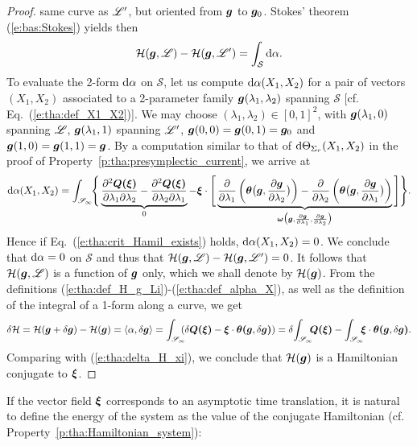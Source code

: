 \begin{proof}
same curve as $\mathscr{L}'$, but oriented from $\bm{g}$ to $\bm{g}_0$.
Stokes' theorem (\ref{e:bas:Stokes}) yields then
\[
    \mathcal{H}(\bm{g},\mathscr{L}) - \mathcal{H}(\bm{g},\mathscr{L}') = \int_{\mathcal{S}} \mathrm{d} \alpha .
\]
To evaluate the 2-form $\mathrm{d} \alpha$ on $\mathcal{S}$, let us compute
$\mathrm{d} \alpha(X_1,X_2)$ for a pair of vectors $(X_1,X_2)$ associated to a
2-parameter family $\bm{g}(\lambda_1,\lambda_2)$ spanning $\mathcal{S}$
[cf. Eq.~(\ref{e:tha:def_X1_X2})]. We may choose $(\lambda_1,\lambda_2)\in[0,1]^2$,
with $\bm{g}(\lambda_1,0)$ spanning $\mathscr{L}$, $\bm{g}(\lambda_1,1)$ spanning $\mathscr{L}'$,
$\bm{g}(0,0) = \bm{g}(0,1) = \bm{g}_0$ and $\bm{g}(1,0) = \bm{g}(1,1) = \bm{g}$.
By a computation similar to that of $\mathrm{d} \Theta_{\Sigma_r} (X_1,X_2)$ in the proof
of Property~\ref{p:tha:presymplectic_current}, we arrive at
\[
    \mathrm{d} \alpha(X_1,X_2) =
    \int_{\mathscr{S}_\infty}\!\!  \Bigg\{
    \underbrace{\frac{\partial^2 \bm{Q}\textbf{(}\bm{\xi}\textbf{)}}{\partial\lambda_1\partial\lambda_2}
    - \frac{\partial^2 \bm{Q}\textbf{(}\bm{\xi}\textbf{)}}{\partial\lambda_2\partial\lambda_1}}_{0}
    - \bm{\xi}\cdot \Bigg[
    \underbrace{
    \frac{\partial }{\partial \lambda_1}
        \left( \bm{\theta} \bm{\big(}\bm{g}, \frac{\partial \bm{g}}{\partial \lambda_2} \bm{\big)} \right)
        - \frac{\partial }{\partial \lambda_2}\left( \bm{\theta}\bm{\big(}\bm{g}, \frac{\partial \bm{g}}{\partial \lambda_1} \bm{\big)} \right)
    }_{\bm{\omega}\bm{\big(}\bm{g},  \frac{\partial \bm{g}}{\partial \lambda_1}, \frac{\partial \bm{g}}{\partial \lambda_2} \bm{\big)}}
        \Bigg] \Bigg\} .
\]
Hence if Eq.~(\ref{e:tha:crit_Hamil_exists}) holds, $\mathrm{d}\alpha(X_1,X_2) = 0$.
We conclude that $\mathrm{d} \alpha = 0$ on $\mathcal{S}$ and thus that
$\mathcal{H}(\bm{g},\mathscr{L}) - \mathcal{H}(\bm{g},\mathscr{L}') = 0$. It follows that
$\mathcal{H}(\bm{g},\mathscr{L})$ is a function of $\bm{g}$ only, which we shall denote
by $\mathcal{H}(\bm{g})$.
From the definitions (\ref{e:tha:def_H_g_Li})-(\ref{e:tha:def_alpha_X}),
as well as the definition of the integral of a 1-form along a curve,
we get
\[
   \delta\mathcal{H} = \mathcal{H}(\w{g}+\delta\w{g}) - \mathcal{H}(\w{g})
   =  \langle \alpha, \delta\w{g} \rangle
     = \int_{\Sp_\infty}\!\!\!\! \left( \delta \w{Q}\lld\w{\xi}\rld
     -  \w{\xi}\cdot\w{\theta}\lld\w{g},\delta\w{g}\rld \right)
    = \delta\! \int_{\Sp_\infty}\!\!\! \w{Q}\lld\w{\xi}\rld
     -  \int_{\Sp_\infty} \!\!\! \w{\xi}\cdot\w{\theta}\lld\w{g},\delta\w{g}\rld .
\]
Comparing with (\ref{e:tha:delta_H_xi}), we conclude that $\mathcal{H}(\bm{g})$
is a Hamiltonian conjugate to $\bm{\xi}$.
\end{proof}

If the vector field $\bm{\xi}$ corresponds to an asymptotic time translation, it
is natural to define the
energy of the system as the value of the conjugate Hamiltonian
(cf. Property~\ref{p:tha:Hamiltonian_system}):

